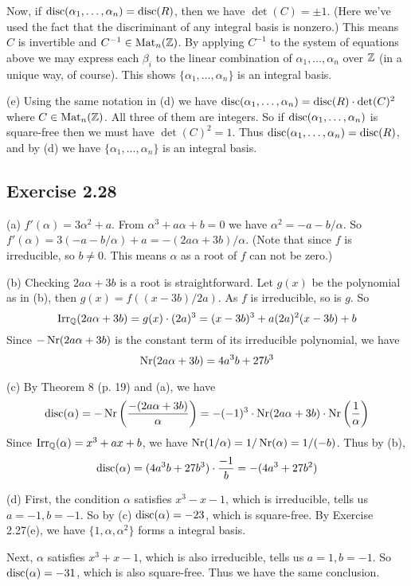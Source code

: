 \documentclass[../Marcus.tex]{subfiles}
\begin{document}
Now, if $\operatorname{disc}(\alpha_1,\ldots,\alpha_n)=\operatorname{disc}(R)$, then we have $\det(C)=\pm 1$. (Here we've used the fact that the discriminant of any integral basis is nonzero.) This means $C$ is invertible and $C^{-1}\in\operatorname{Mat}_n(\mathbb{Z})$. By applying $C^{-1}$ to the system of equations above we may express each $\beta_i$ to the linear combination of $\alpha_1,\ldots,\alpha_n$ over $\mathbb{Z}$ (in a unique way, of course). This shows $\{\alpha_1,\ldots,\alpha_n\}$ is an integral basis.

(e) Using the same notation in (d) we have $\operatorname{disc}(\alpha_1,\ldots,\alpha_n)=\operatorname{disc}(R)\cdot \det(C)^2$ where $C\in\operatorname{Mat}_n(\mathbb{Z})$. All three of them are integers. So if $\operatorname{disc}(\alpha_1,\ldots,\alpha_n)$ is square-free then we must have $\det(C)^2=1$. Thus $\operatorname{disc}(\alpha_1,\ldots,\alpha_n)=\operatorname{disc}(R)$, and by (d) we have $\{\alpha_1,\ldots,\alpha_n\}$ is an integral basis.

\subsection*{Exercise 2.28}

(a) $f'(\alpha)=3\alpha^2+a$. From $\alpha^3+a\alpha+b=0$ we have $\alpha^2=-a-b/\alpha$. So $f'(\alpha)=3(-a-b/\alpha)+a=-(2a\alpha+3b)/\alpha$. (Note that since $f$ is irreducible, so $b\neq 0$. This means $\alpha$ as a root of $f$ can not be zero.)

(b) Checking $2a\alpha+3b$ is a root is straightforward. Let $g(x)$ be the polynomial as in (b), then $g(x)=f((x-3b)/2a)$. As $f$ is irreducible, so is $g$. So $$\operatorname{Irr}_{\mathbb{Q}}(2a\alpha+3b)=g(x)\cdot (2a)^3=(x-3b)^3+a(2a)^2(x-3b)+b$$ Since $-\operatorname{Nr}(2a\alpha+3b)$ is the constant term of its irreducible polynomial, we have $$\operatorname{Nr}(2a\alpha+3b)=4a^3b+27b^3$$

(c) By Theorem 8 (p. 19) and (a), we have $$\operatorname{disc}(\alpha)=-\operatorname{Nr}\left(\frac{-(2a\alpha+3b)}{\alpha}\right)=-(-1)^3\cdot\operatorname{Nr}(2a\alpha+3b)\cdot\operatorname{Nr}\left(\frac{1}{\alpha}\right)$$ Since $\operatorname{Irr}_{\mathbb{Q}}(\alpha)=x^3+ax+b$, we have $\operatorname{Nr}(1/\alpha)=1/\operatorname{Nr}(\alpha)=1/(-b)$. Thus by (b), $$\operatorname{disc}(\alpha)=(4a^3b+27b^3)\cdot\frac{-1}{b}=-(4a^3+27b^2)$$

(d) First, the condition $\alpha$ satisfies $x^3-x-1$, which is irreducible, tells us $a=-1,b=-1$. So by (c) $\operatorname{disc}(\alpha)=-23$, which is square-free. By Exercise 2.27(e), we have $\{1,\alpha,\alpha^2\}$ forms a integral basis.

Next, $\alpha$ satisfies $x^3+x-1$, which is also irreducible, tells us $a=1,b=-1$. So $\operatorname{disc}(\alpha)=-31$, which is also square-free. Thus we have the same conclusion.
\end{document}
